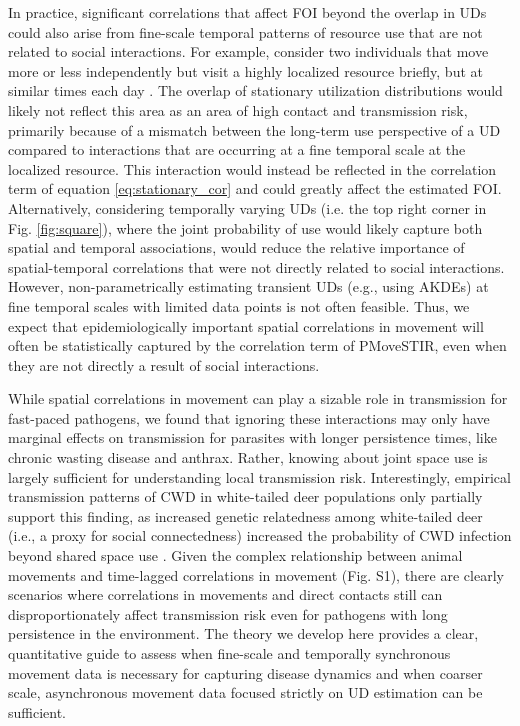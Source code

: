 \documentclass[letterpaper]{article}
\begin{document}
In practice, significant correlations that affect FOI beyond the overlap in UDs could also arise from fine-scale temporal patterns of resource use that are not related to social interactions.  For example, consider two individuals that move more or less independently but visit a highly localized resource briefly, but at similar times each day \citep[e.g., visiting a watering hole at similar times every day][]{VanderWaal2017}. The overlap of stationary utilization distributions would likely not reflect this area as an area of high contact and transmission risk, primarily because of a mismatch between the long-term use perspective of a UD compared to interactions that are occurring at a fine temporal scale at the localized resource.  This interaction would instead be reflected in the correlation term of equation \ref{eq:stationary_cor} and could greatly affect the estimated FOI.  Alternatively, considering temporally varying UDs (i.e. the top right corner in Fig. \ref{fig:square}), where the joint probability of use would likely capture both spatial and temporal associations, would reduce the relative importance of spatial-temporal correlations that were not directly related to social interactions. However, non-parametrically estimating transient UDs (e.g., using AKDEs) at fine temporal scales with limited data points is not often feasible.  Thus, we expect that epidemiologically important spatial correlations in movement will often be statistically captured by the correlation term of PMoveSTIR, even when they are not directly a result of social interactions.

While spatial correlations in movement can play a sizable role in transmission for fast-paced pathogens, we found that ignoring these interactions may only have marginal effects on transmission for parasites with longer persistence times, like chronic wasting disease and anthrax.  Rather, knowing about joint space use is largely sufficient for understanding local transmission risk.  Interestingly, empirical transmission patterns of CWD in white-tailed deer populations only partially support this finding, as increased genetic relatedness among white-tailed deer (i.e., a proxy for social connectedness) increased the probability of CWD infection beyond shared space use \citep{Grear2010}. Given the complex relationship between animal movements and time-lagged correlations in movement (Fig. S1), there are clearly scenarios where correlations in movements and direct contacts still can disproportionately affect transmission risk even for pathogens with long persistence in the environment. The theory we develop here provides a clear, quantitative guide to assess when fine-scale and temporally synchronous movement data is necessary for capturing disease dynamics and when coarser scale, asynchronous movement data focused strictly on UD estimation can be sufficient.
\end{document}
